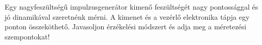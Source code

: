 \begin{example}

Egy nagyfeszültségű impulzusgenerátor kimenő feszültségét nagy pontossággal és jó dinamikával szeretnénk mérni. A kimenet és a vezérlő elektronika tápja egy ponton összeköthető. Javasoljon érzékelési módszert és adja meg a méretezési szempontokat!

\tcbline
\vspace{1mm}

\solution

\end{example}